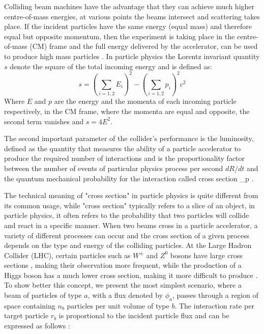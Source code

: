 Colliding beam machines have the advantage that they can achieve much higher centre-of-mass energies, at various points the beams intersect and scattering takes place. If the incident particles have the same energy (equal mass) and therefore equal but opposite momentum, then the experiment is taking place in the centre-of-mass (CM) frame and the full energy delivered by the accelerator, can be used to produce high mass particles  \cite{undergraduate_accelerators_chapter}.
In particle physics the Lorentz invariant quantity $s$ denote the square of the total incoming energy and is defined as: 
\begin{equation}
s = \left ( \sum_{i = 1,2}^{}E_{i} \right )^{2}-\left ( \sum_{i = 1,2}^{}p_{i} \right )^{2}c^{2}
\end{equation}
Where $E$ and \textbf{$p$}  are the energy and the momenta of each incoming particle respectively, in the CM frame, where the momenta are equal and opposite, the second term vanishes and  $s = 4E^2$.

The second important parameter of the collider's performance is the luminosity, defined as the  quantity that measures the ability of a particle accelerator to produce the required number of interactions and is the proportionality factor  between the number of events of particular physics process per second $dR/dt$ and the quantum mechanical probability for the interaction called cross section \sigma_{p} \cite{ref_lib_vol3}.

The technical meaning of "cross section" in particle physics is quite different from its common usage, while "cross section" typically refers to a slice of an object, in particle physics, it often refers to the probability that two particles will collide and react in a specific manner. When two beams cross in a particle accelerator, a variety of different processes can occur and  the cross section of a given process depends on the type and energy of the colliding particles.
At the Large Hadron Collider (LHC), certain particles such as  $W^{\pm}$ and $Z^{0}$ bosons have large cross sections , making their observation more frequent, while the production of a Higgs boson has a much lower cross section, making it more difficult to produce \cite{thomson_2013}.\\

To show better this concept, we present the most simplest scenario, where a beam of particles of type $a$, with a flux denoted by $\phi_{a}$, passes through a region of space containing $n_{b}$ particles per unit volume of type $b$. The interaction rate per target particle $r_{b}$ is proportional to the incident particle flux and can be expressed as follows \cite{thomson_2013}:

